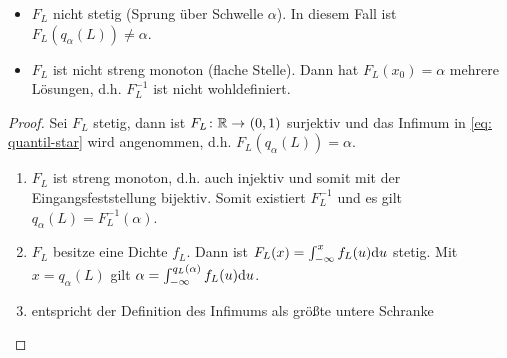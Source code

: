 \begin{*bemerkung}
	\begin{itemize}
		\item $F_L$ nicht stetig (Sprung über Schwelle $\alpha$). In diesem Fall ist $F_L(q_\alpha(L)) \neq \alpha$.
		\item $F_L$ ist nicht streng monoton (flache Stelle). Dann hat $F_L(x_0) = \alpha$ mehrere Lösungen, d.h. $F_L^{-1}$ ist nicht wohldefiniert.
	\end{itemize}
\end{*bemerkung}

\begin{proof}
	Sei $F_L$ stetig, dann ist $\abb{F_L}{\R}{(0,1)}$ surjektiv und das Infimum in \eqref{eq: quantil-star} wird angenommen, d.h. $F_L(q_\alpha(L)) = \alpha$.
	\begin{enumerate}[label=(zu \alph*), leftmargin=*, nolistsep]
		\item $F_L$ ist streng monoton, d.h. auch injektiv und somit mit der Eingangsfeststellung bijektiv. Somit existiert $F_L^{-1}$ und es gilt $q_\alpha(L) = F_L^{-1}(\alpha)$.
		\item $F_L$ besitze eine Dichte $f_L$. Dann ist $F_L(x) = \int_{-\infty}^x f_L(u) \mathrm{d}{u}$ stetig. Mit $x = q_\alpha(L)$ gilt $\alpha = \int_{-\infty}^{q_L(\alpha)} f_L(u) \mathrm{d}{u}$.
		\item entspricht der Definition des Infimums als größte untere Schranke
	\end{enumerate}
\end{proof}

